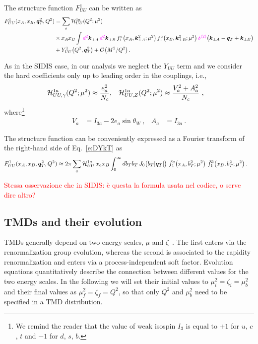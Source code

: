 \documentclass[aps,preprintnumbers,showpacs,nofootinbib,superscriptaddress,floatfix]{revtex4}
\newcommand{\AS}[1]{{\textcolor[rgb]{1,0,1}{#1}}}
\newcommand{\T}{\perp}
\newcommand{\bT}{b_T}
\begin{document}
The structure function $F_{UU}^1$ can be written as
\begin{align}
\label{e:DYkT}
   F_{UU}^1(x_A,x_B, \bm{q}_{T}^2, Q^2) &= \sum_a \mathcal{H}_{UU}^{1 a}(Q^2;\mu^2) \\ 
      &\times x_A x_B \int \AS{d^2}\bm{k}_{\T A}^{} \, \AS{d^2}\bm{k}_{\T B}^{} 
\,  f_1^a\big(x_A,\bm{k}_{\T A}^2; \mu^2 \big) 
\, f_{1}^{\bar{a}}\big(x_B,\bm{k}_{\T B}^2; \mu^2 \big) \,
      \AS{\delta^{(2)}} \big({\bm k}_{\T A} - {\bm q}_T + {\bm k}_{\T B}\big)
\nonumber\\&
\nonumber + Y_{UU}^1\big(Q^2, \bm{q}_T^2\big) + \mathcal{O}\big(M^2/Q^2\big) \, .
\end{align} 


As in the SIDIS case, in our analysis we neglect \AS{the} $Y_{UU}$ term
and we consider the hard coefficients only up to leading order in
the couplings, i.e.,
\begin{align} 
{\cal H}_{UU, \gamma}^{1 a}(Q^2;\mu^2) &\approx \frac{e_a^2}{N_c},
&
{\cal H}_{UU, Z}^{1 a}(Q^2;\mu^2) &\approx \frac{V_a^2+A_a^2}{N_c} \ ,
\end{align}  
where\footnote{We remind the reader that the value of weak isospin $I_3$ is equal to $+1$ for $u$, $c$, $t$ and
  $-1$ for $d$, $s$, $b$.}
\begin{align}
V_a & = I_{3a} - 2 e_{a} \sin \theta_W \  ,
&
A_a & = I_{3a} \  .
\end{align} 

The structure function can be conveniently expressed as a Fourier transform of
the right-hand side of Eq.~\eqref{e:DYkT} as 
\begin{align}
\label{e:DYkTFF}
   F_{UU}^1(x_A,x_B, \bm{q}_T^2, Q^2) &\approx
 2\pi \sum_a {\cal H}_{UU}^{1 a} \,x_a x_B \int_0^{\infty} d \bT \bT\, J_0\big( \bT |\bm{q}_T|\big)\ 
      \tilde{f}_1^a\big(x_A, \bT^2;\mu^2\big) \   \tilde{f}_1^{\bar{a}}\big(x_B, \bT^2;\mu^2 \big)  \, .
\end{align} 

\textcolor{red}{ Stessa osservazione che in SIDIS: \`e questa la formula usata nel codice, o serve dire altro?}



\subsection{TMDs and their evolution}
\label{ss:TMDevo}

\AS{TMDs generally depend on two energy scales, $\mu$ and $\zeta$~\cite{Collins:2011zzd}. 
The first enters via the renormalization group evolution, whereas the second is associated to the rapidity renormalization and enters via a process-independent soft factor. 
Evolution equations quantitatively describe the connection between different values for the two energy scales. 
In the following we will set their initial values to $\mu_i^2=\zeta_i=\mu_b^2$ and their final values as $\mu_f^2=\zeta_f=Q^2$, so that only $Q^2$ and $\mu_b^2$ need to be specified in a TMD distribution.}
\end{document}
